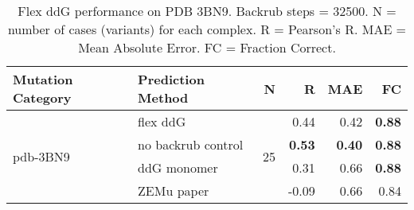 \begin{table}
  \begin{tabular}{llrrrr}
\toprule
Mutation Category &   Prediction Method &   N &     R &  MAE &   FC \\
\midrule
 \multirow{ 4}{*}{pdb-3BN9} & flex ddG & \multirow{ 4}{*}{25} & 0.44 & 0.42 & \textbf{0.88}  \\
 & no backrub control & & \textbf{0.53} & \textbf{0.40} & \textbf{0.88}  \\
 & ddG monomer & & 0.31 & 0.66 & \textbf{0.88}  \\
 & ZEMu paper & & -0.09 & 0.66 & 0.84  \\
\bottomrule
\end{tabular}
  \caption[Flex ddG performance on PDB 3BN9]{
    Flex ddG performance on PDB 3BN9. Backrub steps = 32500. N = number of cases (variants) for each complex. R = Pearson's R. MAE = Mean Absolute Error. FC = Fraction Correct.
  } \label{tab:table-pdb-3BN9}
\end{table}
